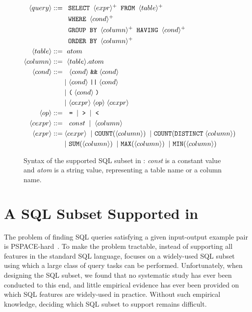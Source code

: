 \begin{figure}[t]
\footnotesize%
\begin{align*}
\q ::= {} 
	& \texttt{ SELECT } \e^+ \texttt{ FROM } \dbtable^+ \\
        & \texttt{ WHERE } \cond^+ \\ 
	&  \texttt{ GROUP BY } \column^+ \texttt{ HAVING } \cond^+\\
	&  \texttt{ ORDER BY } \column^+ \\
\dbtable::= {} &\ atom \\
\column ::= {} &\ \dbtable.atom\\
\cond ::= {} &\ \ \cond \;\texttt{\&\&}\; \cond \\ 
    & |\ \cond \;\texttt{||}\; \cond \\
    & |\ \texttt{(}\;\cond\;\texttt{)} \\
    & |\ \ce \;\op\; \ce \\
\op ::= {} &\ \ \texttt{=} \;\;|\;\; \texttt{>}  \;\;|\;\; \texttt{<}\\
\ce ::= {} &\ \ const \;\;|\;\; \column  \;\; \\
\e ::= {} & \ce \;\;|\ \texttt{COUNT}(\column) \;\;|\ \texttt{COUNT}(\texttt{DISTINCT}\;\column)\\
    & |\ \texttt{SUM}(\column) \;\;|\ \texttt{MAX}(\column) \;\;|\ \texttt{MIN}(\column) 
\end{align*}
\normalsize%
\caption{Syntax of the supported SQL subset in \ourtool:
\textit{const} is a constant value and
\textit{atom} is a string value, representing
a table name or a column name.
}
\label{fig:syntax}
\end{figure}


\section{A SQL Subset Supported in \ourtool}
\label{sec:langsubset}

The problem of finding SQL queries satisfying
a given input-output example pair is PSPACE-hard~\cite{DasSarma:2010}. 
To make the problem tractable,
instead of supporting all features in the standard
SQL language, \ourtool focuses on a widely-used SQL subset
using which a large class of query tasks can be performed.
Unfortunately, when designing the SQL
subset, we found that no systematic
study has ever been conducted to this end,
and little empirical evidence has ever been provided
on which SQL features are widely-used in practice.
Without such empirical knowledge, deciding which
SQL subset to support remains difficult.


